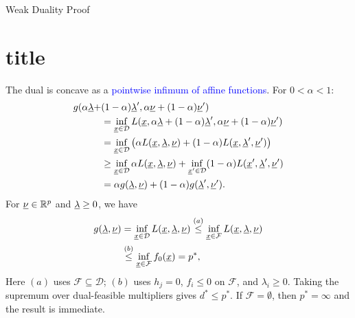 \documentclass[10pt,english,aspectratio=169]{beamer}
\begin{document}
\begin{frame}{Weak Duality Proof}
\part{title}
The dual is concave as a \textcolor{blue}{pointwise infimum of affine functions}. For $0<\alpha<1$:\vspace{-1mm}
\begin{align*}
g(\alpha\vecnot{\lambda}+&(1-\alpha)\vecnot{\lambda}',\alpha\vecnot{\nu}+(1-\alpha)\vecnot{\nu}') \\
&= \inf_{\vecnot{x}\in \mathcal{D}} L(\vecnot{x},\alpha\vecnot{\lambda}+(1-\alpha)\vecnot{\lambda}',\alpha\vecnot{\nu}+(1-\alpha) \vecnot{\nu}') \\
&= \inf_{\vecnot{x}\in \mathcal{D}} \big( \alpha L(\vecnot{x},\vecnot{\lambda},\vecnot{\nu}) + (1-\alpha) L(\vecnot{x},\vecnot{\lambda}',\vecnot{\nu}') \big) \\
&\geq \inf_{\vecnot{x}\in \mathcal{D}} \alpha L(\vecnot{x},\vecnot{\lambda},\vecnot{\nu}) + \inf_{\vecnot{x}'\in \mathcal{D}} (1-\alpha) L(\vecnot{x}',\vecnot{\lambda}',\vecnot{\nu}') \\
&= \alpha g(\vecnot{\lambda},\vecnot{\nu}) + (1-\alpha) g(\vecnot{\lambda}',\vecnot{\nu}'). \vspace{-1mm}
\end{align*}
For $\underline{\nu}\in\mathbb{R}^p$ and $\underline{\lambda}\geq0$, we have \vspace{-2mm}
\begin{align*}
g(\vecnot{\lambda},\vecnot{\nu})
&= \inf_{\vecnot{x}\in \mathcal{D}} L(\vecnot{x},\vecnot{\lambda},\vecnot{\nu})
\stackrel{(a)}{\leq} \inf_{\vecnot{x}\in \mathcal{F}} L(\vecnot{x},\vecnot{\lambda},\vecnot{\nu}) \\
&\stackrel{(b)}{\leq} \inf_{\vecnot{x}\in\mathcal{F}} f_0(\vecnot{x})
= p^*, \vspace{-3mm}
\end{align*}
Here $(a)$ uses $\mathcal{F}\subseteq\mathcal{D}$; $(b)$ uses $h_j=0$, $f_i\leq0$ on $\mathcal{F}$, and $\lambda_i\geq0$.
Taking the supremum over dual-feasible multipliers gives $d^*\leq p^*$.
If $\mathcal{F}=\emptyset$, then $p^*=\infty$ and the result is immediate.

\end{frame}
\end{document}
